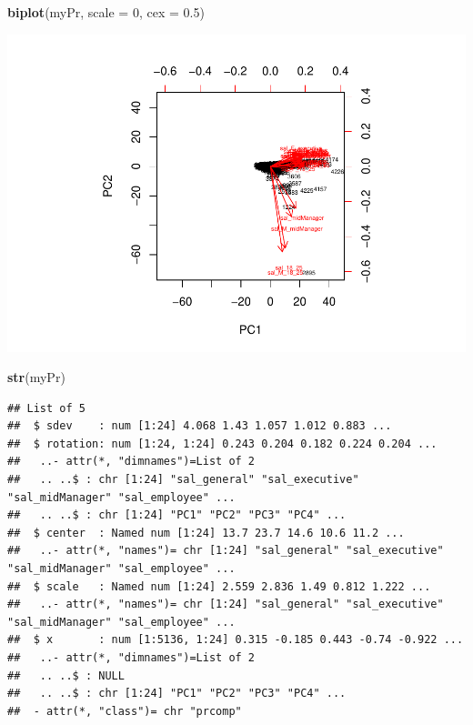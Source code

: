 \documentclass[]{article}
\newenvironment{Shaded}{\begin{snugshade}}{\end{snugshade}}
\newcommand{\KeywordTok}[1]{\textcolor[rgb]{0.13,0.29,0.53}{\textbf{#1}}}
\newcommand{\DataTypeTok}[1]{\textcolor[rgb]{0.13,0.29,0.53}{#1}}
\newcommand{\DecValTok}[1]{\textcolor[rgb]{0.00,0.00,0.81}{#1}}
\newcommand{\FloatTok}[1]{\textcolor[rgb]{0.00,0.00,0.81}{#1}}
\newcommand{\NormalTok}[1]{#1}
\begin{document}
\begin{Shaded}
\begin{Highlighting}[]
\KeywordTok{biplot}\NormalTok{(myPr, }\DataTypeTok{scale =} \DecValTok{0}\NormalTok{, }\DataTypeTok{cex =} \FloatTok{0.5}\NormalTok{)}
\end{Highlighting}
\end{Shaded}

\includegraphics{TSLproject_files/figure-latex/unnamed-chunk-19-2.pdf}

\begin{Shaded}
\begin{Highlighting}[]
\KeywordTok{str}\NormalTok{(myPr)}
\end{Highlighting}
\end{Shaded}

\begin{verbatim}
## List of 5
##  $ sdev    : num [1:24] 4.068 1.43 1.057 1.012 0.883 ...
##  $ rotation: num [1:24, 1:24] 0.243 0.204 0.182 0.224 0.204 ...
##   ..- attr(*, "dimnames")=List of 2
##   .. ..$ : chr [1:24] "sal_general" "sal_executive" "sal_midManager" "sal_employee" ...
##   .. ..$ : chr [1:24] "PC1" "PC2" "PC3" "PC4" ...
##  $ center  : Named num [1:24] 13.7 23.7 14.6 10.6 11.2 ...
##   ..- attr(*, "names")= chr [1:24] "sal_general" "sal_executive" "sal_midManager" "sal_employee" ...
##  $ scale   : Named num [1:24] 2.559 2.836 1.49 0.812 1.222 ...
##   ..- attr(*, "names")= chr [1:24] "sal_general" "sal_executive" "sal_midManager" "sal_employee" ...
##  $ x       : num [1:5136, 1:24] 0.315 -0.185 0.443 -0.74 -0.922 ...
##   ..- attr(*, "dimnames")=List of 2
##   .. ..$ : NULL
##   .. ..$ : chr [1:24] "PC1" "PC2" "PC3" "PC4" ...
##  - attr(*, "class")= chr "prcomp"
\end{verbatim}
\end{document}
